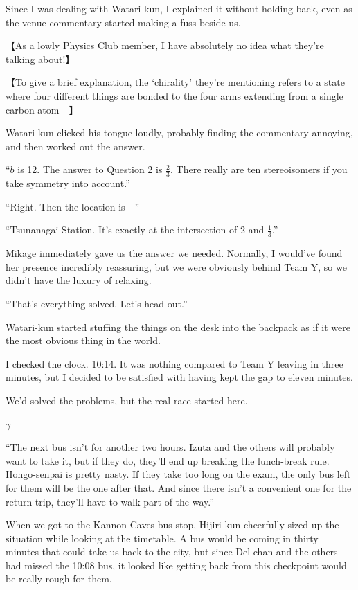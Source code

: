 \documentclass[
    a4paper,
    12pt,
    twoside,
    openany,
    UTF8,
    fontset=windows
]{ctexbook}
\begin{document}
Since I was dealing with Watari-kun, I explained it without holding back, even as the venue commentary started making a fuss beside us.

【As a lowly Physics Club member, I have absolutely no idea what they're talking about!】

【To give a brief explanation, the `chirality' they're mentioning refers to a state where four different things are bonded to the four arms extending from a single carbon atom---】

Watari-kun clicked his tongue loudly, probably finding the commentary annoying, and then worked out the answer.

``$b$ is 12. The answer to Question 2 is $\frac{2}{3}$. There really are ten stereoisomers if you take symmetry into account.''

``Right. Then the location is---''

``Tsunanagai Station. It's exactly at the intersection of 2 and $\frac{1}{3}$.''

Mikage immediately gave us the answer we needed. Normally, I would've found her presence incredibly reassuring, but we were obviously behind Team Y, so we didn't have the luxury of relaxing.

``That's everything solved. Let's head out.''

Watari-kun started stuffing the things on the desk into the backpack as if it were the most obvious thing in the world.

I checked the clock. 10:14. It was nothing compared to Team Y leaving in three minutes, but I decided to be satisfied with having kept the gap to eleven minutes.

We'd solved the problems, but the real race started here.

$\gamma$

``The next bus isn't for another two hours. Izuta and the others will probably want to take it, but if they do, they'll end up breaking the lunch-break rule. Hongo-senpai is pretty nasty. If they take too long on the exam, the only bus left for them will be the one after that. And since there isn't a convenient one for the return trip, they'll have to walk part of the way.''

When we got to the Kannon Caves bus stop, Hijiri-kun cheerfully sized up the situation while looking at the timetable. A bus would be coming in thirty minutes that could take us back to the city, but since Del-chan and the others had missed the 10:08 bus, it looked like getting back from this checkpoint would be really rough for them.
\end{document}
